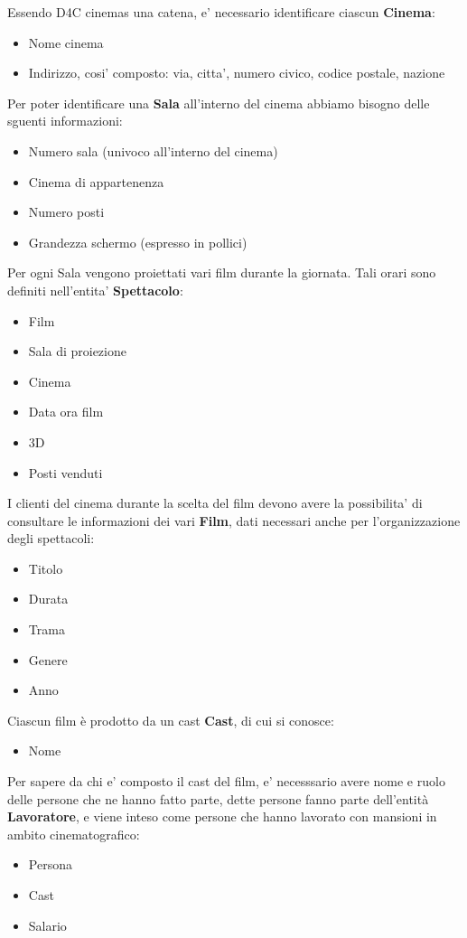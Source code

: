 \documentclass[10pt]{article}
\begin{document}
	Essendo D4C cinemas una catena, e' necessario identificare ciascun {\bf Cinema}:
	\begin{itemize}
		\item Nome cinema
		\item Indirizzo, cosi' composto: via, citta', numero civico, codice postale, nazione
	\end{itemize}
	Per poter identificare una {\bf Sala} all'interno del cinema abbiamo bisogno delle sguenti informazioni:
	\begin{itemize}
		\item Numero sala (univoco all'interno del cinema)
		\item Cinema di appartenenza
		\item Numero posti
		\item Grandezza schermo (espresso in pollici)
	\end{itemize}
	Per ogni Sala vengono proiettati vari film durante la giornata. Tali orari sono definiti nell'entita' {\bf Spettacolo}:
	\begin{itemize}
		\item Film
		\item Sala di proiezione
		\item Cinema
	    \item Data ora film
	    \item 3D
	    \item Posti venduti
	\end{itemize}
	I clienti del cinema durante la scelta del film devono avere la possibilita' di consultare le informazioni dei vari \textbf{Film}, dati necessari anche per l'organizzazione degli spettacoli:
	\begin{itemize}
		\item Titolo
		\item Durata
		\item Trama
		\item Genere
		\item Anno
	\end{itemize}
	Ciascun film è prodotto da un cast {\bf Cast}, di cui si conosce:
	\begin{itemize}
		\item Nome
	\end{itemize}
	Per sapere da chi e' composto il cast del film, e' necesssario avere nome e ruolo delle persone che ne hanno fatto parte, dette persone fanno parte dell'entità {\bf Lavoratore}, e viene inteso come persone che hanno lavorato con mansioni in ambito cinematografico:
	\begin{itemize}
		\item Persona
		\item Cast
		\item Salario
	\end{itemize}
\end{document}

